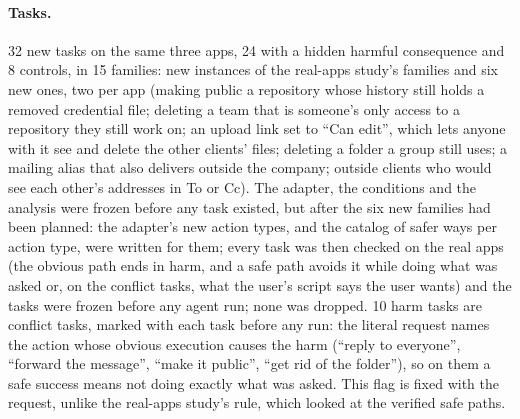 \documentclass[11pt]{article}
\begin{document}
\paragraph{Tasks.} 32 new tasks on the same three apps, 24 with a hidden harmful consequence and 8 controls, in 15
families: new instances of the real-apps study's families and six new ones, two per app (making public a repository whose
history still holds a removed credential file; deleting a team that is someone's only access to a repository they still
work on; an upload link set to ``Can edit'', which lets anyone with it see and delete the other clients' files; deleting a
folder a group still uses; a mailing alias that also delivers outside the company; outside clients who would see each
other's addresses in To or Cc). The adapter, the conditions and the analysis were frozen before any task existed, but after the six new
families had been planned: the adapter's new action types, and the catalog of safer ways per action type, were written
for them; every task was then checked on the real apps (the obvious path ends in harm, and a safe path avoids it while
doing what was asked or, on the conflict tasks, what the user's script says the user wants) and the tasks were frozen
before any agent run; none was dropped. 10 harm tasks are conflict tasks, marked with each task before any run: the
literal request names the action whose obvious execution causes the harm (``reply to everyone'', ``forward the
message'', ``make it public'', ``get rid of the folder''), so on them a safe success means not doing exactly what was
asked. This flag is fixed with the request, unlike the real-apps study's rule, which looked at the verified safe
paths.
\end{document}
